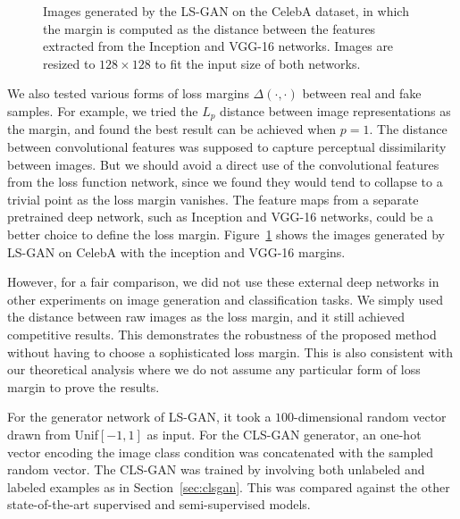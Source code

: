 \begin{figure}[t]
{\begin{minipage}{0.35\linewidth}
\begin{center}
\end{center}
\end{minipage}}
   \caption{Images generated by the LS-GAN on the CelebA dataset, in which the margin is computed as the distance between the features extracted from the Inception and VGG-16 networks. Images are resized to $128\times 128$ to fit the input size of both networks.}\label{fig:inception_vgg}
\end{figure}

We also tested various forms of loss margins $\Delta(\cdot,\cdot)$ between real and fake samples.
For example, we tried the $L_p$ distance between image representations as the margin, and found the best result can be achieved when $p=1$.
The distance between convolutional features was supposed to capture perceptual dissimilarity between images.
But we should avoid a direct use of the convolutional features from the loss function network, since we found they would tend to collapse to a trivial point as the loss margin vanishes.
The feature maps from a separate pretrained deep network, such as Inception and VGG-16 networks, could be a better choice to define the loss margin. Figure~\ref{fig:inception_vgg} shows the images generated by LS-GAN on CelebA with the inception and VGG-16 margins.

However, for a fair comparison, we did not use these external deep networks in other experiments on image generation and classification tasks. We simply used the distance between raw images as the loss margin, and it still achieved competitive results. This demonstrates the robustness of the proposed method without having to choose a sophisticated loss margin. This is also consistent with our theoretical analysis where we do not assume any particular form of loss margin to prove the results.

%

For the generator network of LS-GAN, it took a $100$-dimensional random vector drawn from Unif$[-1,1]$ as input. For the
CLS-GAN generator, an one-hot vector encoding the image class condition was concatenated with the sampled random vector. The CLS-GAN was trained by involving both unlabeled and labeled examples as in Section~\ref{sec:clsgan}. This was compared against the other state-of-the-art supervised and semi-supervised models.

